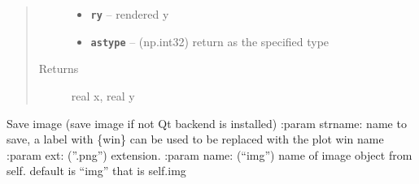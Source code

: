 \documentclass[letterpaper,10pt,english]{sphinxmanual}
\begin{document}
\begin{fulllineitems}
\begin{fulllineitems}
\begin{quote}
\begin{description}
\begin{itemize}
\item {} 
\textbf{\texttt{ry}} -- rendered y

\item {} 
\textbf{\texttt{astype}} -- (np.int32) return as the specified type

\end{itemize}

\item[{Returns}] \leavevmode
real x, real y

\end{description}\end{quote}

\end{fulllineitems}


\begin{fulllineitems}
\label{RRtoolbox.lib:RRtoolbox.lib.plotter.plotim.rx1}
\end{fulllineitems}


\begin{fulllineitems}
\label{RRtoolbox.lib:RRtoolbox.lib.plotter.plotim.rx2}
\end{fulllineitems}


\begin{fulllineitems}
\label{RRtoolbox.lib:RRtoolbox.lib.plotter.plotim.ry1}
\end{fulllineitems}


\begin{fulllineitems}
\label{RRtoolbox.lib:RRtoolbox.lib.plotter.plotim.ry2}
\end{fulllineitems}


\begin{fulllineitems}
\label{RRtoolbox.lib:RRtoolbox.lib.plotter.plotim.save}
Save image (save image if not Qt backend is installed)
:param strname: name to save, a label with \{win\} can be used to be replaced with the plot win name
:param ext: (''.png'') extension.
:param name: (``img'') name of image object from self. default is ``img'' that is self.img
\begin{quote}


\end{quote}
\end{fulllineitems}
\end{fulllineitems}
\end{document}
